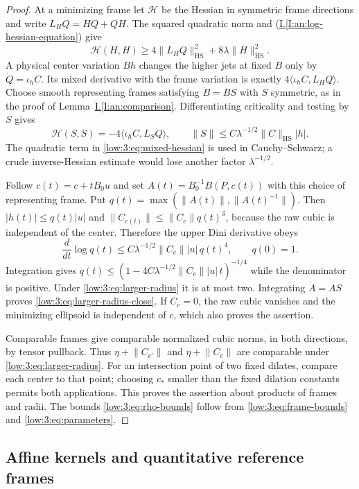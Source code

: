 \documentclass[11pt]{amsart}
\theoremstyle{definition}
\theoremstyle{remark}
\newcommand{\norm}[1]{\lVert #1\rVert}
\newcommand{\abs}[1]{\lvert #1\rvert}
\newcommand{\ip}[2]{\langle #1,#2\rangle}
\numberwithin{equation}{section}
\newcommand{\partIref}[1]{\hyperref[I:#1]{I.\ref*{I:#1}}}
\newcommand{\partIeqref}[1]{\textup{(\partIref{#1})}}
\begin{document}
\begin{proof}
At a minimizing frame let $\mathcal H$ be the Hessian in symmetric frame directions and write $L_HQ=HQ+QH$. The squared quadratic norm and \partIeqref{an:log-hessian-equation} give
\begin{equation}\label{low:3:eq:mixed-hessian}
\mathcal H(H,H)\geq4\norm{L_HQ}_{\mathrm{HS}}^2+8\lambda\norm H_{\mathrm{HS}}^2.
\end{equation}
A physical center variation $Bh$ changes the higher jets at fixed $B$ only by $\dot Q=\iota_hC$. Its mixed derivative with the frame variation is exactly $4\ip{\iota_hC}{L_HQ}$. Choose smooth representing frames satisfying $\dot B=BS$ with $S$ symmetric, as in the proof of Lemma~\partIref{an:comparison}. Differentiating criticality and testing by $S$ gives
\[
\mathcal H(S,S)=-4\ip{\iota_hC}{L_SQ},\qquad \norm S\leq C\lambda^{-1/2}\norm C_{\mathrm{HS}}\abs h.
\]
The quadratic term in \eqref{low:3:eq:mixed-hessian} is used in Cauchy--Schwarz; a crude inverse-Hessian estimate would lose another factor $\lambda^{-1/2}$.

Follow $c(t)=c+tB_0u$ and set $A(t)=B_0^{-1}B(P,c(t))$ with this choice of representing frame. Put $q(t)=\max(\norm{A(t)},\norm{A(t)^{-1}})$. Then $\abs{h(t)}\leq q(t)\abs u$ and $\norm{C_{c(t)}}\leq\norm{C_c}q(t)^3$, because the raw cubic is independent of the center. Therefore the upper Dini derivative obeys
\[
\frac{d}{dt}\log q(t)\leq C\lambda^{-1/2}\norm{C_c}\abs u\,q(t)^4,\qquad q(0)=1.
\]
Integration gives $q(t)\leq(1-4C\lambda^{-1/2}\norm{C_c}\abs u\,t)^{-1/4}$ while the denominator is positive. Under \eqref{low:3:eq:larger-radius} it is at most two. Integrating $\dot A=AS$ proves \eqref{low:3:eq:larger-radius-close}. If $C_c=0$, the raw cubic vanishes and the minimizing ellipsoid is independent of $c$, which also proves the assertion.

Comparable frames give comparable normalized cubic norms, in both directions, by tensor pullback. Thus $\eta+\norm{C_{c'}}$ and $\eta+\norm{C_c}$ are comparable under \eqref{low:3:eq:larger-radius}. For an intersection point of two fixed dilates, compare each center to that point; choosing $c_*$ smaller than the fixed dilation constants permits both applications. This proves the assertion about products of frames and radii. The bounds \eqref{low:3:eq:rho-bounds} follow from \eqref{low:3:eq:frame-bounds} and \eqref{low:3:eq:parameters}.
\end{proof}

\subsection{Affine kernels and quantitative reference frames}\label{cubic:frames}\label{low:3:sec:quantitative}
\end{document}
